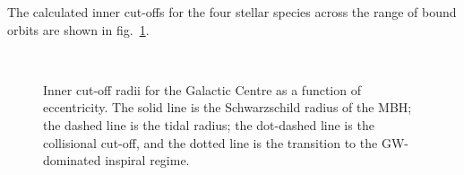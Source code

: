 \documentclass[useAMS,usedcolumn,usegraphicx,usenatbib]{mn2e}
\newcommand{\figref}[1]{fig.~\ref{fig:#1}}
\begin{document}
The calculated inner cut-offs for the four stellar species across the range of bound orbits are shown in \figref{Cuts}.
\begin{figure}
\begin{center}
    \quad 
    \\
    \quad
\caption{Inner cut-off radii for the Galactic Centre as a function of eccentricity. The solid line is the Schwarzschild radius of the MBH; the dashed line is the tidal radius; the dot-dashed line is the collisional cut-off, and the dotted line is the transition to the GW-dominated inspiral regime.\label{fig:Cuts}}
  \end{center}
\end{figure}
\end{document}
